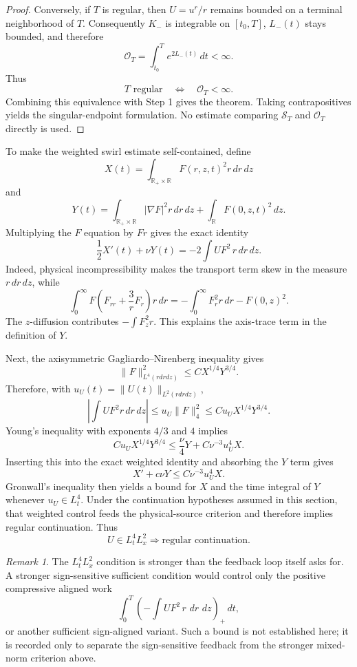 \documentclass[11pt]{article}
\theoremstyle{definition}\newtheorem{definition}[theorem]{Definition}
\theoremstyle{remark}\newtheorem{remark}[theorem]{Remark}
\newcommand{\R}{\mathbb R}\newcommand{\dd}{\,d}\newcommand{\HH}{\mathcal H}
\begin{document}
\begin{proof}
Conversely, if $T$ is regular, then $U=u^r/r$ remains bounded on a terminal
neighborhood of $T$.  Consequently $K_-$ is integrable on $[t_0,T]$,
$L_-(t)$ stays bounded, and therefore
\[
 \mathcal O_T=\int_{t_0}^Te^{2L_-(t)}\,dt<\infty.
\]
Thus
\[
 T\text{ regular}
 \quad\Longleftrightarrow\quad
 \mathcal O_T<\infty.
\]
Combining this equivalence with Step 1 gives the theorem.  Taking
contrapositives yields the singular-endpoint formulation.  No estimate
comparing $\mathcal S_T$ and $\mathcal O_T$ directly is used.
\end{proof}

To make the weighted swirl estimate self-contained, define
\[
 X(t)=\int_{\R_+\times\R}F(r,z,t)^2r\,dr\,dz
\]
and
\[
 Y(t)=\int_{\R_+\times\R}|\nabla F|^2r\,dr\,dz
      +\int_{\R}F(0,z,t)^2\,dz.
\]
Multiplying the $F$ equation by $Fr$ gives the exact identity
\[
\boxed{
\frac12X'(t)+\nu Y(t)
=
-2\int U F^2\,r\,dr\,dz.
}
\]
Indeed, physical incompressibility makes the transport term skew in the measure $r\,dr\,dz$, while
\[
 \int_0^\infty F\left(F_{rr}+\frac3rF_r\right)r\,dr
 =-\int_0^\infty F_r^2r\,dr-F(0,z)^2.
\]
The $z$-diffusion contributes $-\int F_z^2r$.  This explains the axis-trace term in the definition of $Y$.

Next, the axisymmetric Gagliardo--Nirenberg inequality gives
\[
 \|F\|_{L^4(rdrdz)}^2
 \le C X^{1/4}Y^{3/4}.
\]
Therefore, with $u_U(t)=\|U(t)\|_{L^2(rdrdz)}$,
\[
 \left|\int UF^2r\,dr\,dz\right|
 \le u_U\|F\|_4^2
 \le C u_U X^{1/4}Y^{3/4}.
\]
Young's inequality with exponents $4/3$ and $4$ implies
\[
 C u_U X^{1/4}Y^{3/4}
 \le \frac{\nu}{4}Y+C\nu^{-3}u_U^4X.
\]
Inserting this into the exact weighted identity and absorbing the $Y$ term gives
\[
 X'+c\nu Y
 \le C\nu^{-3}u_U^4X.
\]
Gronwall's inequality then yields a bound for $X$ and the time integral of $Y$ whenever $u_U\in L_t^4$.  Under the continuation hypotheses assumed in this section, that weighted control feeds the physical-source criterion and therefore implies regular continuation.  Thus
\[
 U\in L_t^4L_x^2
 \Longrightarrow
 \text{regular continuation}.
\]

\begin{remark}
The \(L_t^4L_x^2\) condition is stronger than the feedback loop itself asks
for.  A stronger sign-sensitive sufficient condition would control only the positive
compressive aligned work
\[
\boxed{
\int_0^T
\left(
-\int UF^2\,r\,\dd r\,\dd z
\right)_+
\dd t,
}
\]
or another sufficient sign-aligned variant.  Such a bound is not established here; it is recorded only to separate the sign-sensitive feedback from the stronger mixed-norm criterion above.
\end{remark}
\end{document}

